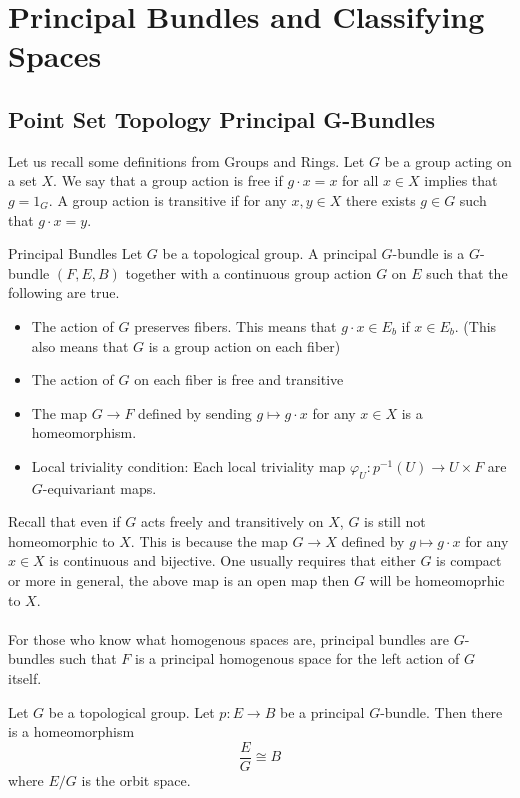 \documentclass[a4paper]{article}
\begin{document}
\pagebreak
\section{Principal Bundles and Classifying Spaces}
\subsection{Point Set Topology Principal G-Bundles}
Let us recall some definitions from Groups and Rings. Let $G$ be a group acting on a set $X$. We say that a group action is free if $g\cdot x=x$ for all $x\in X$ implies that $g=1_G$. A group action is transitive if for any $x,y\in X$ there exists $g\in G$ such that $g\cdot x=y$. 

\begin{defn}{Principal Bundles}{} Let $G$ be a topological group. A principal $G$-bundle is a $G$-bundle $(F,E,B)$ together with a continuous group action $G$ on $E$ such that the following are true. 
\begin{itemize}
\item The action of $G$ preserves fibers. This means that $g\cdot x\in E_b$ if $x\in E_b$. (This also means that $G$ is a group action on each fiber)
\item The action of $G$ on each fiber is free and transitive
\item The map $G\to F$ defined by sending $g\mapsto g\cdot x$ for any $x\in X$ is a homeomorphism. 
\item Local triviality condition: Each local triviality map $\varphi_U:p^{-1}(U)\to U\times F$ are $G$-equivariant maps. 
\end{itemize}
\end{defn}

Recall that even if $G$ acts freely and transitively on $X$, $G$ is still not homeomorphic to $X$. This is because the map $G\to X$ defined by $g\mapsto g\cdot x$ for any $x\in X$ is continuous and bijective. One usually requires that either $G$ is compact or more in general, the above map is an open map then $G$ will be homeomoprhic to $X$. \\~\\

For those who know what homogenous spaces are, principal bundles are $G$-bundles such that $F$ is a principal homogenous space for the left action of $G$ itself. 

\begin{prp}{}{} Let $G$ be a topological group. Let $p:E\to B$ be a principal $G$-bundle. Then there is a homeomorphism $$\frac{E}{G}\cong B$$ where $E/G$ is the orbit space. 
\end{prp}
\end{document}
